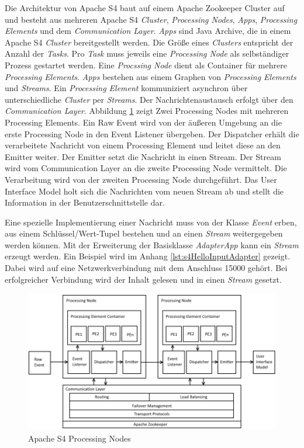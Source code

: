 Die Architektur von Apache S4 baut auf einem Apache Zookeeper Cluster auf und besteht aus mehreren Apache S4 \textit{Cluster}, \textit{Processing Nodes}, \textit{Apps}, \textit{Processing Elements} und dem \textit{Communication Layer}. \textit{Apps} sind Java Archive, die in einem Apache S4 \textit{Cluster} bereitgestellt werden. Die Größe eines \textit{Clusters} entspricht der Anzahl der \textit{Tasks}. Pro \textit{Task} muss jeweils eine \textit{Processing Node} als selbständiger Prozess gestartet werden. Eine \textit{Procssing Node} dient als Container für mehrere \textit{Processing Elements}. \textit{Apps} bestehen aus einem Graphen von \textit{Processing Elements} und \textit{Streams}. Ein \textit{Processing Element} kommuniziert asynchron über unterschiedliche \textit{Cluster} per \textit{Streams}. Der Nachrichtenaustausch erfolgt über den \textit{Communication Layer}. Abbildung \ref{fig:s4ProcessingNode} zeigt Zwei Processing Nodes mit mehreren Processing Elements. Ein Raw Event wird von der äußeren Umgebung an die erste Processing Node in den Event Listener übergeben. Der Dispatcher erhält die verarbeitete Nachricht von einem Processing Element und leitet diese an den Emitter weiter. Der Emitter setzt die Nachricht in einen Stream. Der Stream wird vom Communication Layer an die zweite Processing Node vermittelt. Die Verarbeitung wird von der zweiten Processing Node durchgeführt. Das User Interface Model holt sich die Nachrichten vom neuen Stream ab und stellt die Information in der Benutzerschnittstelle dar.

Eine spezielle Implementierung einer Nachricht muss von der Klasse \textit{Event} erben, aus einem Schlüssel/Wert-Tupel bestehen und an einen \textit{Stream} weitergegeben werden können. Mit der Erweiterung der Basisklasse \textit{AdapterApp} kann ein \textit{Stream} erzeugt werden. Ein Beispiel wird im Anhang \ref{lst:s4HelloInputAdapter} gezeigt. Dabei wird auf eine Netzwerkverbindung mit dem Anschluss 15000 gehört. Bei erfolgreicher Verbindung wird der Inhalt gelesen und in einen \textit{Stream} gesetzt. 

\begin{figure}[htb!]
\centering
\includegraphics[width=1.0\textwidth]{bilder/s4ProcessingNodes.png}
\caption{Apache S4 Processing Nodes
\label{fig:s4ProcessingNode}}
\end{figure}

